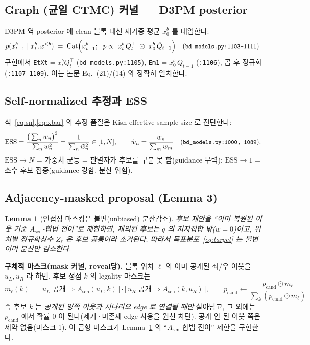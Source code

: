 \documentclass[11pt]{article}
\newcommand{\code}[1]{\texttt{\small #1}}
\newcommand{\xpre}{x^{<b}}        %
\newcommand{\xblk}{x^{b}}         %
\newcommand{\Qb}{\bar{Q}}
\newcommand{\xbar}{\bar{x}}
\DeclareMathOperator{\Cat}{Cat}
\theoremstyle{plain}
\newtheorem{lemma}{Lemma}
\theoremstyle{definition}
\begin{document}
\subsection{Graph (균일 CTMC) 커널 — D3PM posterior}
D3PM 역 posterior 에 clean 블록 대신 재가중 평균 $\xbar^b_0$ 를 대입한다:
\begin{equation}
p(\xblk_{t-1}\mid \xblk_t,\xpre)\;=\;
\Cat\!\Big(\xblk_{t-1};\ \ p \propto\ \xblk_t\,Q_t^{\top}\ \odot\ \xbar^{b}_0\,\Qb_{t-1}\Big)
\quad(\code{bd\_models.py:1103--1111}).
\label{eq:graphpost}
\end{equation}
구현에서 \code{EtXt}$=\xblk_t Q_t^\top$ (\code{bd\_models.py:1105}),
\code{Em1}$=\xbar^b_0\,\Qb_{t-1}$ (\code{:1106}), 곱 후 정규화(\code{:1107--1109}).
이는 논문 Eq.~(21)/(14) 와 정확히 일치한다.

\subsection{Self-normalized 추정과 ESS}
식~\eqref{eq:sn},\eqref{eq:xbar} 의 추정 품질은 Kish effective sample size 로 진단한다:
\begin{equation}
\mathrm{ESS}=\frac{\big(\sum_{n} w_n\big)^2}{\sum_{n} w_n^2}
=\frac{1}{\sum_n \tilde{w}_n^{2}}\in[1,N],\qquad \tilde{w}_n=\frac{w_n}{\sum_m w_m}
\quad(\code{bd\_models.py:1000,\ 1089}).
\end{equation}
$\mathrm{ESS}\!\to\!N$ = 가중치 균등 = 판별자가 후보를 구분 못 함(guidance 무력);
$\mathrm{ESS}\!\to\!1$ = 소수 후보 집중(guidance 강함, 분산 위험).

\subsection{Adjacency-masked proposal (Lemma 3)}
\begin{lemma}[인접성 마스킹은 불편(unbiased) 분산감소]\label{lem:adj}
후보 제안을 ``이미 복원된 이웃 기준 $A_\mathrm{scn}$-합법 전이''로 제한하면,
제외된 후보는 $q$ 의 지지집합 밖($w=0$)이고, 위치별 정규화상수 $Z_\ell$ 은
후보-공통이라 소거된다. 따라서 목표분포~\eqref{eq:target} 는 불변이며 분산만 감소한다.
\end{lemma}
\noindent \textbf{구체적 마스크(mask 커널, reveal당).} 블록 위치 $\ell$ 의 이미 공개된
좌/우 이웃을 $u_L,u_R$ 라 하면, 후보 정점 $k$ 의 legality 마스크는
\begin{equation}
m_\ell(k)=\Big[\,u_L\text{ 공개}\Rightarrow A_\mathrm{scn}(u_L,k)\,\Big]\cdot
          \Big[\,u_R\text{ 공개}\Rightarrow A_\mathrm{scn}(k,u_R)\,\Big],\qquad
p_{\text{cand}}\leftarrow \frac{p_{\text{cand}}\odot m_\ell}{\sum_k (p_{\text{cand}}\odot m_\ell)}
\end{equation}
즉 후보 $k$ 는 \emph{공개된 양쪽 이웃과 시나리오 edge 로 연결될 때만} 살아남고, 그 외에는
$p_{\text{cand}}$ 에서 확률 0 이 된다(제거·미존재 edge 사용을 원천 차단). 공개 안 된 이웃 쪽은
제약 없음(마스크 1). 이 곱형 마스크가 Lemma~\ref{lem:adj} 의 ``$A_\mathrm{scn}$-합법 전이''
제한을 구현한다.
\end{document}
